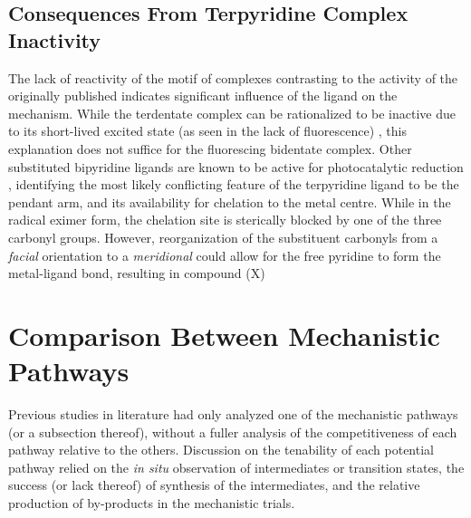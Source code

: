 \FloatBarrier

\subsection{Consequences From \texorpdfstring{}{Bidentate} Terpyridine Complex Inactivity}

The lack of reactivity of the  motif of complexes contrasting to the activity of the originally published  indicates significant influence of the ligand on the mechanism. While the terdentate complex can be rationalized to be inactive due to its short-lived excited state (as seen in the lack of fluorescence) \autocite{shavaleev2004}, this explanation does not suffice for the fluorescing bidentate complex. Other substituted bipyridine ligands are known to be active for photocatalytic reduction \autocite{hawecker1986} , identifying the most likely conflicting feature of the terpyridine ligand to be the pendant arm, and its availability for chelation to the metal centre. While in the radical eximer form, the chelation site is sterically blocked by one of the three carbonyl groups. However, reorganization of the substituent carbonyls from a \textit{facial} orientation to a \textit{meridional} could allow for the free pyridine to form the metal-ligand bond, resulting in compound (X)



\section{Comparison Between Mechanistic Pathways} \label{sec.compare}

Previous studies in literature had only analyzed one of the mechanistic pathways (or a subsection thereof), without a fuller analysis of the competitiveness of each pathway relative to the others. Discussion on the tenability of each potential pathway relied on the \textit{in situ} observation of intermediates or transition states, the success (or lack thereof) of synthesis of the intermediates, and the relative production of by-products in the mechanistic trials. 

